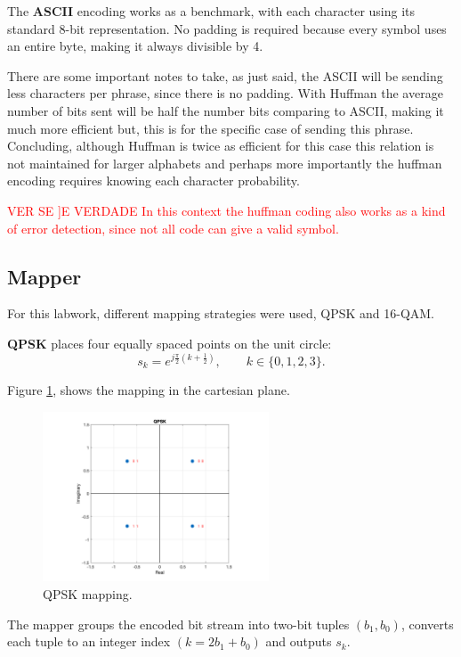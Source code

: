 The \textbf{ASCII} encoding works as a benchmark, with each character using its standard 8-bit representation. No padding is required because every symbol uses an entire byte, making it always divisible by 4. 

There are some important notes to take, as just said, the ASCII will be sending less characters per phrase, since there is no padding. With Huffman the average number of bits sent will be half the number bits comparing to ASCII, making it much more efficient but, this is for the specific case of sending this phrase. Concluding, although Huffman is twice as efficient for this case this relation is not maintained for larger alphabets and perhaps more importantly the huffman encoding requires knowing each character probability.

\textcolor{red}{VER SE ]E VERDADE  In this context the huffman coding also works as a kind of error detection, since not all code can give a valid symbol.}

\subsection{Mapper}

For this labwork, different mapping strategies were used, QPSK and 16-QAM.

\textbf{QPSK} places four equally spaced points on the unit circle:
\[
s_k = e^{j\frac{\pi}{2}\left(k+\tfrac12\right)}, \qquad k\in\{0,1,2,3\}.
\]

Figure \ref{fig:QPKS_Mapping}, shows the mapping in the cartesian plane.

\begin{figure}[h]
  \centering
  \includegraphics[width=0.6\textwidth]{Images/QPKS_Mapping.png}
  \caption{QPSK mapping.}
  \label{fig:QPKS_Mapping}
\end{figure}

The mapper groups the encoded bit stream into two-bit tuples $(b_1,b_0)$, converts each tuple to an integer index $(k =2b_1+b_0)$ and outputs \(s_k\).

